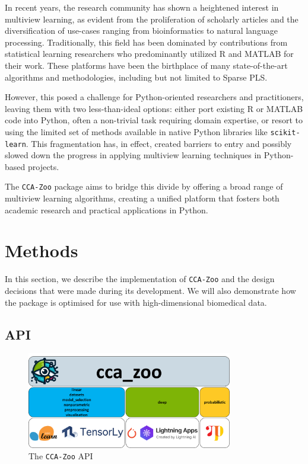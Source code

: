 In recent years, the research community has shown a heightened interest in multiview learning, as evident from the proliferation of scholarly articles and the diversification of use-cases ranging from bioinformatics to natural language processing.
Traditionally, this field has been dominated by contributions from statistical learning researchers who predominantly utilized R and MATLAB for their work.
These platforms have been the birthplace of many state-of-the-art algorithms and methodologies, including but not limited to Sparse PLS.

However, this posed a challenge for Python-oriented researchers and practitioners, leaving them with two less-than-ideal options: either port existing R or MATLAB code into Python, often a non-trivial task requiring domain expertise, or resort to using the limited set of methods available in native Python libraries like \texttt{scikit-learn}.
This fragmentation has, in effect, created barriers to entry and possibly slowed down the progress in applying multiview learning techniques in Python-based projects.

The \texttt{CCA-Zoo} package aims to bridge this divide by offering a broad range of multiview learning algorithms, creating a unified platform that fosters both academic research and practical applications in Python.

\section{Methods}

In this section, we describe the implementation of \texttt{CCA-Zoo} and the design decisions that were made during its development.
We will also demonstrate how the package is optimised for use with high-dimensional biomedical data.

\subsection{API}

\begin{figure}
    \centering
    \includegraphics[width=0.8\textwidth]{figures/CCA_Zoo_map}
    \caption{The \texttt{CCA-Zoo} API}
    \label{fig:cca-zoo-api}
\end{figure}

